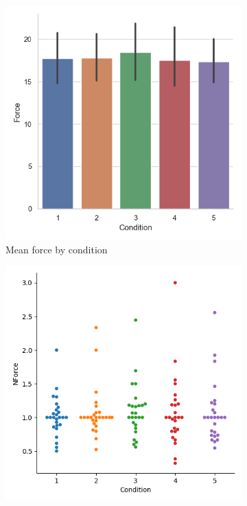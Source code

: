 \begin{figure}[H]
\begin{subfigure}[b]{0.4\textwidth}
         \includegraphics[width=\textwidth]{Files/Plots/force_mean_by_condition.png}
         \caption{Mean force by condition}
         \label{fig:allForceMeanCond}
     \end{subfigure}          
     \hspace*{\fill}
     \begin{subfigure}[b]{0.4\textwidth}
         \centering
         \includegraphics[width=\textwidth]{Files/Plots/forceNforce_by_cond_swarm.png}

\end{subfigure}
\end{figure}
